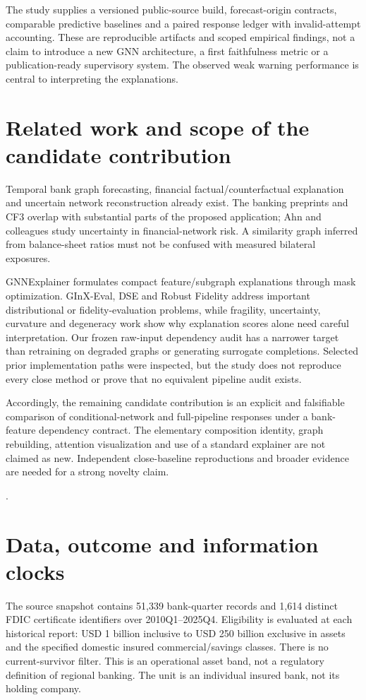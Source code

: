 \documentclass[11pt]{article}
\begin{document}
The study supplies a versioned public-source build, forecast-origin contracts, comparable predictive baselines and a paired response ledger with invalid-attempt accounting. These are reproducible artifacts and scoped empirical findings, not a claim to introduce a new GNN architecture, a first faithfulness metric or a publication-ready supervisory system. The observed weak warning performance is central to interpreting the explanations.

\section{Related work and scope of the candidate contribution}
Temporal bank graph forecasting, financial factual/counterfactual explanation and uncertain network reconstruction already exist. The banking preprints and CF3 overlap with substantial parts of the proposed application; Ahn and colleagues study uncertainty in financial-network risk. A similarity graph inferred from balance-sheet ratios must not be confused with measured bilateral exposures.

GNNExplainer formulates compact feature/subgraph explanations through mask optimization. GInX-Eval, DSE and Robust Fidelity address important distributional or fidelity-evaluation problems, while fragility, uncertainty, curvature and degeneracy work show why explanation scores alone need careful interpretation. Our frozen raw-input dependency audit has a narrower target than retraining on degraded graphs or generating surrogate completions. Selected prior implementation paths were inspected, but the study does not reproduce every close method or prove that no equivalent pipeline audit exists.

Accordingly, the remaining candidate contribution is an explicit and falsifiable comparison of conditional-network and full-pipeline responses under a bank-feature dependency contract. The elementary composition identity, graph rebuilding, attention visualization and use of a standard explainer are not claimed as new. Independent close-baseline reproductions and broader evidence are needed for a strong novelty claim.

\citep{stgat2026,multiplex2026,cf3_2025,ahn2024,gnnexplainer2019,ginx2023,dse2022,rfidelity2024,fragile2024,eugnn2024,curvature2025,degenerate2026,xgnncert2025}.
\section{Data, outcome and information clocks}
The source snapshot contains 51,339 bank-quarter records and 1,614 distinct FDIC certificate identifiers over 2010Q1--2025Q4. Eligibility is evaluated at each historical report: USD 1 billion inclusive to USD 250 billion exclusive in assets and the specified domestic insured commercial/savings classes. There is no current-survivor filter. This is an operational asset band, not a regulatory definition of regional banking. The unit is an individual insured bank, not its holding company.
\end{document}
